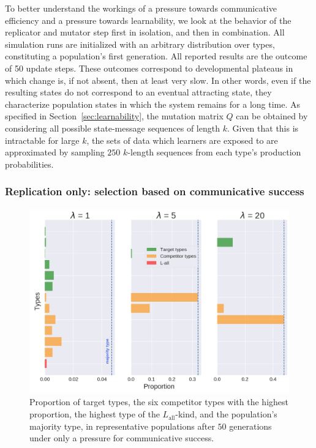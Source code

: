 \documentclass[a4paper, 11pt]{article}
\theoremstyle{Satz}
\newcommand{\mylang}[1]{\ensuremath{L_{\text{#1}}}\xspace} %
\newcommand{\Lall}{\mylang{all}}
\begin{document}
To better understand the workings of a pressure towards communicative efficiency and a pressure
towards learnability, we look at the behavior of the replicator and mutator step first in
isolation, and then in combination. All simulation runs are initialized with an arbitrary
distribution over types, constituting a population's first generation. All reported results are
the outcome of 50 update steps. These outcomes correspond to developmental plateaus in which
change is, if not absent, then at least very slow. In other words, even if the resulting states
do not correspond to an eventual attracting state, they characterize population states in which the system remains for a long time. As specified in Section~\ref{sec:learnability}, the
mutation matrix $Q$ can be obtained by considering all possible state-message sequences of
length $k$. Given that this is intractable for large $k$, the sets of data which learners are
exposed to are approximated by sampling $250$ $k$-length sequences from each type's production
probabilities.


\subsubsection{Replication only: selection based on communicative success} 

\begin{figure}[t]
\centering
\includegraphics[width=\textwidth,height=8cm, keepaspectratio]{./plots/barh-onlyr}
\caption{Proportion of target types, the six competitor types with the highest proportion, the highest type of the $\Lall$-kind, and the population's majority type, in representative populations after $50$ generations under only a
  pressure for communicative success.}
\label{fig:only-R}
\end{figure}
\end{document}
